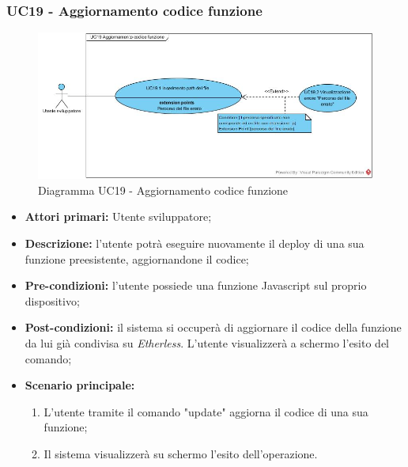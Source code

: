 \subsubsection{UC19 - Aggiornamento codice funzione}
\begin{figure}[h]
	\centering
	\includegraphics[width=\linewidth]{res/img/UC19.jpg}
	\caption{Diagramma UC19 - Aggiornamento codice funzione}
\end{figure}
\begin{itemize}
	\item \textbf{Attori primari:} Utente sviluppatore;
	\item \textbf{Descrizione:} l'utente potrà eseguire nuovamente il deploy di una sua funzione preesistente, aggiornandone il codice; 
	\item \textbf{Pre-condizioni:} l'utente possiede una funzione Javascript sul proprio dispositivo;
	\item \textbf{Post-condizioni:} il sistema si occuperà di aggiornare il codice della funzione da lui già condivisa su \textit{Etherless}. L'utente visualizzerà a schermo l'esito del comando;
	\item \textbf{Scenario principale:} 
	\begin{enumerate}
		\item L'utente tramite il comando "update" aggiorna il codice di una sua funzione;
		\item Il sistema visualizzerà su schermo l'esito dell'operazione.
	\end{enumerate}
\end{itemize}